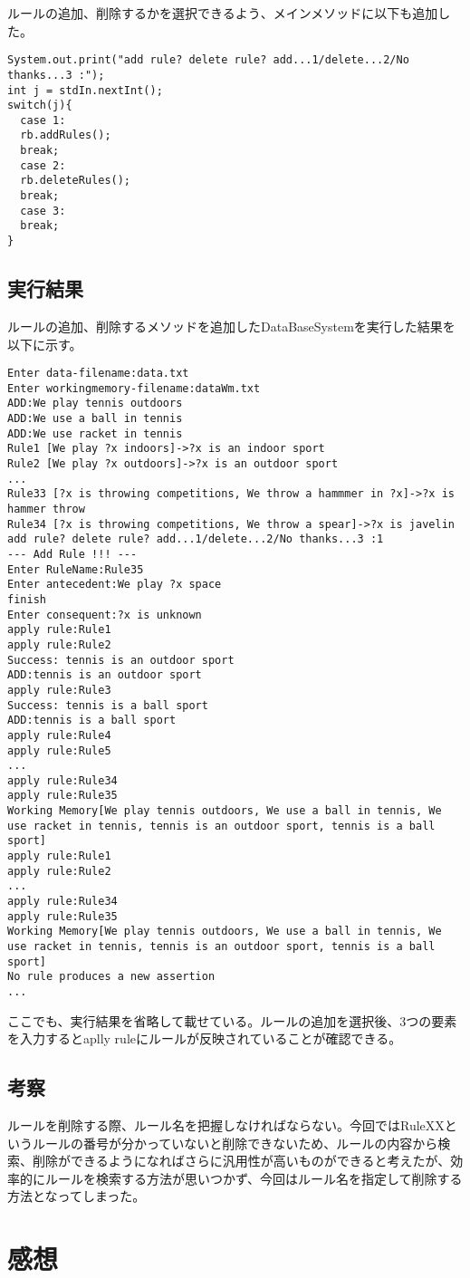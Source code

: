 \documentclass[a4j]{jarticle}
\begin{document}
ルールの追加、削除するかを選択できるよう、メインメソッドに以下も追加した。
\begin{lstlisting}
System.out.print("add rule? delete rule? add...1/delete...2/No thanks...3 :");
int j = stdIn.nextInt();
switch(j){
  case 1:
  rb.addRules();
  break;
  case 2:
  rb.deleteRules();
  break;
  case 3:
  break;
}
\end{lstlisting}
\subsection{実行結果}
ルールの追加、削除するメソッドを追加したDataBaseSystemを実行した結果を以下に示す。
\begin{lstlisting}
Enter data-filename:data.txt
Enter workingmemory-filename:dataWm.txt
ADD:We play tennis outdoors
ADD:We use a ball in tennis
ADD:We use racket in tennis
Rule1 [We play ?x indoors]->?x is an indoor sport
Rule2 [We play ?x outdoors]->?x is an outdoor sport
...
Rule33 [?x is throwing competitions, We throw a hammmer in ?x]->?x is hammer throw
Rule34 [?x is throwing competitions, We throw a spear]->?x is javelin
add rule? delete rule? add...1/delete...2/No thanks...3 :1
--- Add Rule !!! ---
Enter RuleName:Rule35
Enter antecedent:We play ?x space
finish
Enter consequent:?x is unknown
apply rule:Rule1
apply rule:Rule2
Success: tennis is an outdoor sport
ADD:tennis is an outdoor sport
apply rule:Rule3
Success: tennis is a ball sport
ADD:tennis is a ball sport
apply rule:Rule4
apply rule:Rule5
...
apply rule:Rule34
apply rule:Rule35
Working Memory[We play tennis outdoors, We use a ball in tennis, We use racket in tennis, tennis is an outdoor sport, tennis is a ball sport]
apply rule:Rule1
apply rule:Rule2
...
apply rule:Rule34
apply rule:Rule35
Working Memory[We play tennis outdoors, We use a ball in tennis, We use racket in tennis, tennis is an outdoor sport, tennis is a ball sport]
No rule produces a new assertion
...
\end{lstlisting}
ここでも、実行結果を省略して載せている。ルールの追加を選択後、3つの要素を入力するとaplly ruleにルールが反映されていることが確認できる。
\subsection{考察}
ルールを削除する際、ルール名を把握しなければならない。今回ではRuleXXというルールの番号が分かっていないと削除できないため、ルールの内容から検索、削除ができるようになればさらに汎用性が高いものができると考えたが、効率的にルールを検索する方法が思いつかず、今回はルール名を指定して削除する方法となってしまった。
\section{感想}
\end{document}
